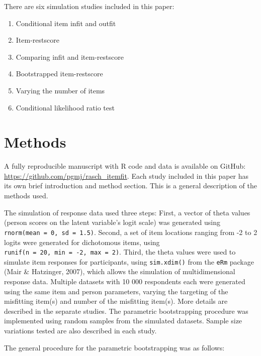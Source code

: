 \documentclass[
  letterpaper,
  DIV=11,
  numbers=noendperiod]{scrartcl}
\providecommand{\tightlist}{%
  \setlength{\itemsep}{0pt}\setlength{\parskip}{0pt}}\usepackage{longtable,booktabs,array}
\begin{document}
There are six simulation studies included in this paper:

\begin{enumerate}
\def\labelenumi{\arabic{enumi}.}
\tightlist
\item
  Conditional item infit and outfit
\item
  Item-restscore
\item
  Comparing infit and item-restscore
\item
  Bootstrapped item-restscore
\item
  Varying the number of items
\item
  Conditional likelihood ratio test
\end{enumerate}

\section{Methods}\label{methods}

A fully reproducible manuscript with R code and data is available on
GitHub: \url{https://github.com/pgmj/rasch_itemfit}. Each study included
in this paper has its own brief introduction and method section. This is
a general description of the methods used.

The simulation of response data used three steps: First, a vector of
theta values (person scores on the latent variable's logit scale) was
generated using \texttt{rnorm(mean\ =\ 0,\ sd\ =\ 1.5)}. Second, a set
of item locations ranging from -2 to 2 logits were generated for
dichotomous items, using
\texttt{runif(n\ =\ 20,\ min\ =\ -2,\ max\ =\ 2)}. Third, the theta
values were used to simulate item responses for participants, using
\texttt{sim.xdim()} from the \texttt{eRm} package (Mair \& Hatzinger,
2007), which allows the simulation of multidimensional response data.
Multiple datasets with 10 000 respondents each were generated using the
same item and person parameters, varying the targeting of the misfitting
item(s) and number of the misfitting item(s). More details are described
in the separate studies. The parametric bootstrapping procedure was
implemented using random samples from the simulated datasets. Sample
size variations tested are also described in each study.

The general procedure for the parametric bootstrapping was as follows:
\end{document}
